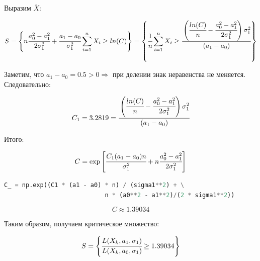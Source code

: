 \documentclass[a4paper, 14pt]{extarticle}
\begin{document}
Выразим $\overline{X}$:

\vspace{-20pt}

\begin{equation*}
    S = \left\{n \cfrac{a^2_0 - a^2_1}{2\sigma^2_1} + 
    \cfrac{a_1 - a_0}{\sigma^2_1} \sum\limits_{i=1}^n X_i \geq ln(C)\right\} = 
    \left\{\cfrac{1}{n} \sum\limits_{i=1}^n X_i \geq \cfrac{\left(\cfrac{ln(C)}{n} - 
     \cfrac{a^2_0 - a^2_1}{2\sigma^2_1}\right) \sigma^2_1}{(a_1 - a_0)}\right\}
\end{equation*}

Заметим, что $a_1 - a_0 = 0.5 > 0 \Rightarrow$ при делении знак неравенства не меняется. \\

Следовательно:

\begin{equation*}
    C_1 = 3.2819 = \cfrac{\left(\cfrac{ln(C)}{n} - \cfrac{a^2_0 - a^2_1}{2\sigma^2_1}\right) \sigma^2_1}{(a_1 - a_0)}
\end{equation*}

Итого:

\begin{equation*}
    C = \exp \left[ \cfrac{C_1 (a_1 - a_0) n}{\sigma_1^2} + 
    n \cfrac{a_0^2 - a_1^2}{2 \sigma_1^2} \right]
\end{equation*}

\begin{center}
  \begin{lstlisting}[language=Python]
C_ = np.exp((C1 * (a1 - a0) * n) / (sigma1**2) + \
                            n * (a0**2 - a1**2)/(2 * sigma1**2))
  \end{lstlisting}
\end{center}

\vspace{-10pt}

\begin{equation*}
    C \approx 1.39034
\end{equation*}

\vspace{10pt}

Таким образом, получаем критическое множество:

\begin{equation*}
    S = \left\{\cfrac{L(X_k, a_1, \sigma_1)}{L(X_k, a_0, \sigma_1)} \geq 1.39034\right\}
\end{equation*}

\vspace{10pt}
\end{document}
